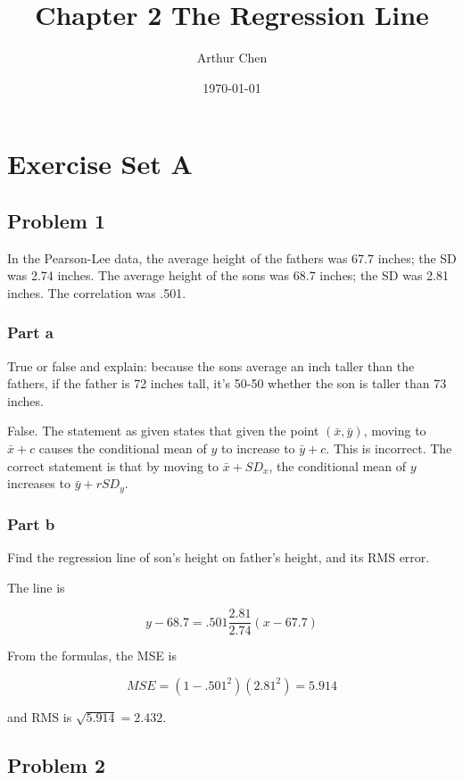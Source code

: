 \documentclass{article}
\author{Arthur Chen}
\title{Chapter 2 The Regression Line}
\date{\today}
\begin{document}
\maketitle

\section*{Exercise Set A}

\subsection*{Problem 1}

In the Pearson-Lee data, the average height of the fathers was 67.7 inches; the SD was 2.74 inches. The average height of the sons was 68.7 inches; the SD was 2.81 inches. The correlation was .501.

\subsubsection*{Part a}

True or false and explain: because the sons average an inch taller than the fathers, if the father is 72 inches tall, it's 50-50 whether the son is taller than 73 inches.

False. The statement as given states that given the point $(\bar{x}, \bar{y})$, moving to $\bar{x} + c$ causes the conditional mean of $y$ to increase to $\bar{y} + c$. This is incorrect. The correct statement is that by moving to $\bar{x} + SD_x$, the conditional mean of $y$ increases to $\bar{y} + r SD_y$.

\subsubsection*{Part b}

Find the regression line of son's height on father's height, and its RMS error.

The line is

\[
y - 68.7 = .501 \frac{2.81}{2.74}(x - 67.7)
\]

From the formulas, the MSE is

\[
MSE = (1-.501^2)(2.81^2) = 5.914
\]

and RMS is $\sqrt{5.914} = 2.432$.

\subsection*{Problem 2}
\end{document}
